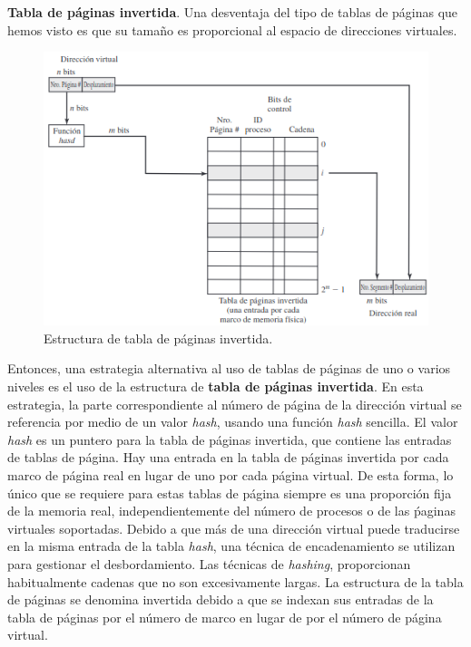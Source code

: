 \documentclass[12pt,a4paper]{article}
\begin{document}
\textbf{Tabla de páginas invertida}. Una desventaja del tipo de tablas de páginas que hemos visto es que su tamaño es proporcional al espacio de direcciones virtuales. 
\begin{figure}[H]
    \centering
    \includegraphics[width=15cm]{virtual4.png}
    \caption{Estructura de tabla de páginas invertida.}
\end{figure}
Entonces, una estrategia alternativa al uso de tablas de páginas de uno o varios niveles es el uso de la estructura de \textbf{tabla de páginas invertida}. En esta estrategia, la parte correspondiente al número de página de la dirección virtual se referencia por medio de un valor \textit{hash}, usando una función \textit{hash} sencilla. El valor \textit{hash} es un puntero para la tabla de páginas invertida, que contiene las entradas de tablas de página. Hay una entrada en la tabla de páginas invertida por cada marco de página real en lugar de uno por cada página virtual. De esta forma, lo único que se requiere para estas tablas de página siempre es una proporción fija de la memoria real, independientemente del número de procesos o de las ṕaginas virtuales soportadas. Debido a que más de una dirección virtual puede traducirse en la misma entrada de la tabla \textit{hash}, una técnica de encadenamiento se utilizan para gestionar el desbordamiento. Las técnicas de \textit{hashing}, proporcionan habitualmente cadenas que no son excesivamente largas. La estructura de la tabla de páginas se denomina invertida debido a que se indexan sus entradas de la tabla de páginas por el número de marco en lugar de por el número de página virtual. \\\\ 
\end{document}
